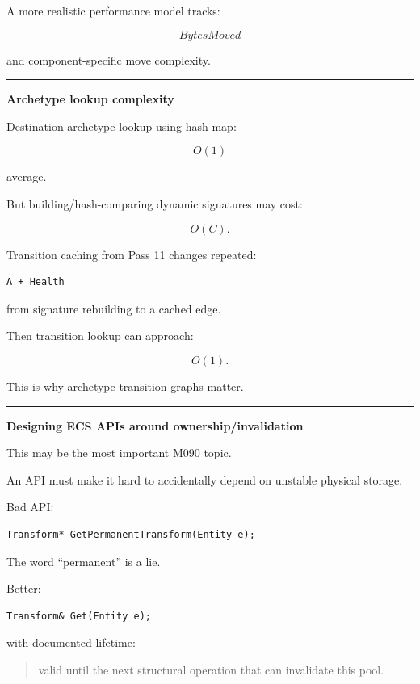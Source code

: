 A more realistic performance model tracks:

\[
BytesMoved
\]

and component-specific move complexity.

\begin{center}\rule{0.5\linewidth}{0.5pt}\end{center}

\textbf{Archetype lookup complexity}

Destination archetype lookup using hash map:

\[
O(1)
\]

average.

But building/hash-comparing dynamic signatures may cost:

\[
O(C).
\]

Transition caching from Pass 11 changes repeated:

\begin{verbatim}
A + Health
\end{verbatim}

from signature rebuilding to a cached edge.

Then transition lookup can approach:

\[
O(1).
\]

This is why archetype transition graphs matter.

\begin{center}\rule{0.5\linewidth}{0.5pt}\end{center}

\textbf{Designing ECS APIs around ownership/invalidation}

This may be the most important M090 topic.

An API must make it hard to accidentally depend on unstable physical storage.

Bad API:

\begin{verbatim}
Transform* GetPermanentTransform(Entity e);
\end{verbatim}

The word ``permanent'' is a lie.

Better:

\begin{verbatim}
Transform& Get(Entity e);
\end{verbatim}

with documented lifetime:

\begin{quote}
valid until the next structural operation that can invalidate this pool.
\end{quote}

